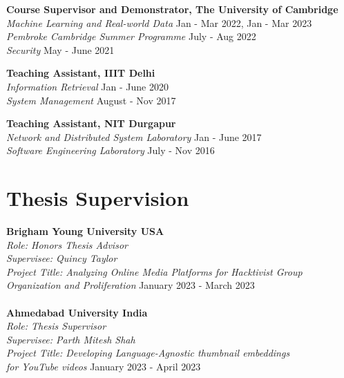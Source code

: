 \documentclass[margin, centered,lmodern]{res}
\begin{document}
\begin{resume}
\textbf{Course Supervisor and Demonstrator, The University of Cambridge} \\
\emph{Machine Learning and Real-world Data} \hfill Jan - Mar 2022, Jan - Mar 2023 \\
\emph{Pembroke Cambridge Summer Programme} \hfill July - Aug 2022 \\
\emph{Security} \hfill May - June 2021 

\textbf{Teaching Assistant, IIIT Delhi} \\
\emph{Information Retrieval} \hfill Jan - June 2020 \\
\emph{System Management} \hfill August - Nov 2017


\textbf{Teaching Assistant, NIT Durgapur} \\
\emph{Network and Distributed System Laboratory} \hfill Jan - June 2017 \\
\emph{Software Engineering Laboratory} \hfill July - Nov 2016

\section{Thesis Supervision}

\textbf{Brigham Young University USA} \\
\emph{Role: Honors Thesis Advisor \\Supervisee: Quincy Taylor \\ Project Title: Analyzing Online Media Platforms for Hacktivist Group \\Organization and Proliferation} \hfill January 2023 -  March 2023 \\ \\
\textbf{Ahmedabad University India} \\ 
\emph{Role: Thesis Supervisor \\ Supervisee: Parth Mitesh Shah \\ Project Title: Developing Language-Agnostic thumbnail embeddings\\for YouTube videos} \hfill January 2023 -  April 2023 \\


\end{resume}
\end{document}
